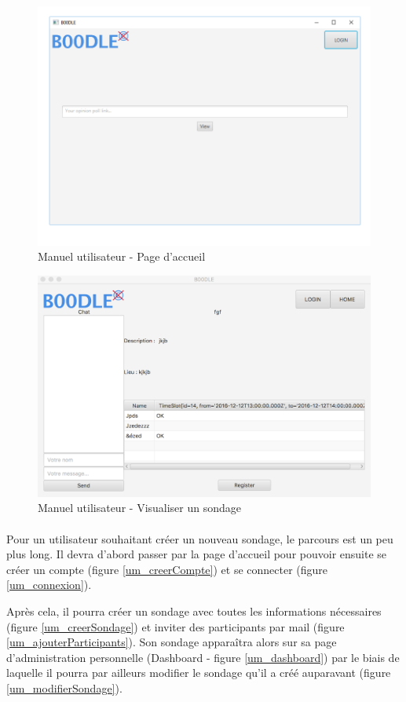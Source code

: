\documentclass[titlepage]{report}
\begin{document}
\begin{figure}[h]
	\caption{Manuel utilisateur - Page d'accueil}
	\label{um_accueil}
	\centering
	\includegraphics[width=\textwidth]{figures/CapturesEcrans/home.png}
\end{figure}

\begin{figure}[h]
	\caption{Manuel utilisateur - Visualiser un sondage}
	\label{um_voirSondage}
	\centering
	\includegraphics[width=\textwidth]{figures/CapturesEcrans/viewPoll.png}
\end{figure}

\clearpage

\paragraph{} Pour un utilisateur souhaitant créer un nouveau sondage, le parcours est un peu plus long. Il devra d'abord passer par la page d'accueil pour pouvoir ensuite se créer un compte (figure \ref{um_creerCompte}) et se connecter (figure \ref{um_connexion}).
\par Après cela, il pourra créer un sondage avec toutes les informations nécessaires (figure \ref{um_creerSondage}) et inviter des participants par mail (figure \ref{um_ajouterParticipants}). Son sondage apparaîtra alors sur sa page d'administration personnelle (Dashboard - figure \ref{um_dashboard}) par le biais de laquelle il pourra par ailleurs modifier le sondage qu'il a créé auparavant (figure \ref{um_modifierSondage}).
\end{document}
